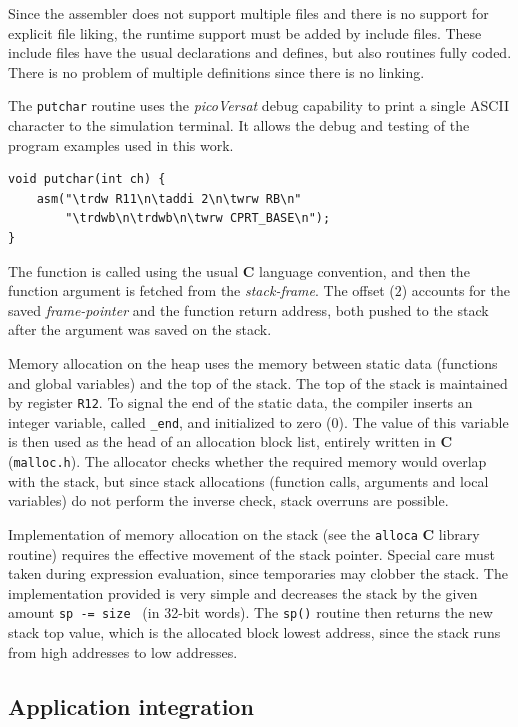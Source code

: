 \documentclass[journal]{IEEEtran}
\begin{document}
Since the assembler does not support multiple files
and there is no support for explicit file liking,
the runtime support must be added by include files.
These include files have the usual declarations
and defines, but also routines fully coded.
There is no problem of multiple definitions since
there is no linking.

The {\tt putchar} routine uses the {\it picoVersat} debug capability to
print a single {\sc ASCII} character to the simulation terminal.
It allows the debug and testing of the program examples used in this work.

{\footnotesize
\begin{verbatim}
void putchar(int ch) {
    asm("\trdw R11\n\taddi 2\n\twrw RB\n"
        "\trdwb\n\trdwb\n\twrw CPRT_BASE\n");
}
\end{verbatim}
}
The function is called using the usual {\bf C} language convention, and then
the function argument is fetched from the {\it stack-frame}.
The offset ($2$) accounts for the saved {\it frame-pointer} and the function
return address, both pushed to the stack after the argument was saved on the
stack.

Memory allocation on the heap uses the memory between static data (functions
and global variables) and the top of the stack.
The top of the stack is maintained by register {\tt R12}.
To signal the end of the static data, the compiler inserts an integer
variable, called {\tt \_end}, and initialized to zero ($0$).
The value of this variable is then used as the head of an allocation block
list, entirely written in {\bf C} ({\tt malloc.h}).
The allocator checks whether the required memory would overlap with the stack,
but since stack allocations (function calls, arguments and local variables)
do not perform the inverse check, stack overruns are possible.

Implementation of memory allocation on the stack (see the {\tt alloca}
{\bf C} library routine) requires the effective movement of the stack pointer.
Special care must taken during expression evaluation, since temporaries may
clobber the stack.
The implementation provided is very simple and decreases the stack by the
given amount {\tt sp -= size } (in 32-bit words).
The {\tt sp()} routine then returns the new stack top value, which is the
allocated block lowest address, since the stack runs from high addresses
to low addresses.


\subsection{Application integration}
\end{document}
